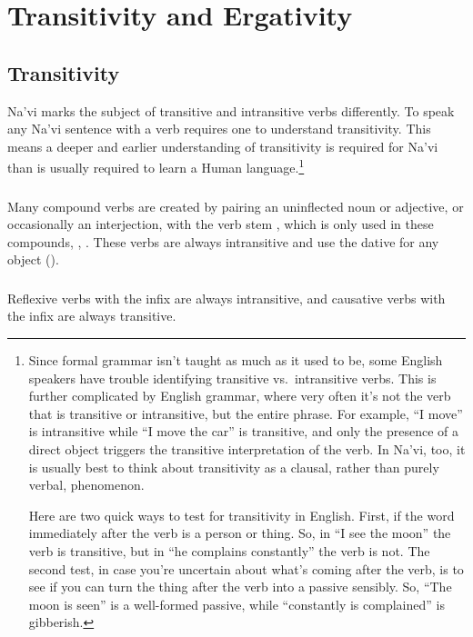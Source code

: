 
\section{Transitivity and Ergativity}

\subsection{Transitivity} Na'vi marks the subject of transitive and
intransitive verbs differently.  To speak any Na'vi sentence
with a verb requires one to understand transitivity.  This means a
deeper and earlier understanding of transitivity is required for Na'vi
than is usually required to learn a Human language.\footnote{Since
formal grammar isn't taught as much as it used to be, some English
speakers have trouble identifying transitive vs.\ intransitive
verbs.  This is further complicated by English grammar, where very
often it's not the verb that is transitive or intransitive, but the
entire phrase.  For example, ``I move'' is intransitive while ``I
move the car'' is transitive, and only the presence of a direct
object triggers the transitive interpretation of the verb.  In
Na'vi, too, it is usually best to think about transitivity as a
clausal, rather than purely verbal, phenomenon.

Here are two quick ways to test for transitivity in English.  First,
if the word immediately after the verb is a person or thing.  So, in
``I see the moon'' the verb is transitive, but in ``he complains
constantly'' the verb is not.  The second test, in case you're
uncertain about what's coming after the verb, is to see if you can
turn the thing after the verb into a passive sensibly.  So, ``The moon
is seen'' is a well-formed passive, while ``constantly is complained''
is gibberish.}

\subsubsection{} Many compound verbs are created by pairing an
uninflected noun or adjective, or occasionally an interjection,
with the verb stem  , which is only used 
in these compounds,  ,  .
These verbs are always intransitive and use the dative for any object
().

\subsubsection{} Reflexive verbs with the  infix are
always intransitive, and causative verbs with the  infix
are always transitive.

